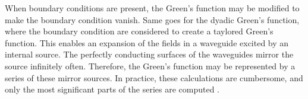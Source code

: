 When boundary conditions are present, the Green's function may be modified to make the boundary condition vanish. Same goes for the dyadic Green's function, where the boundary condition are considered to create a taylored Green's function. This enables an expansion of the fields in a waveguide excited by an internal source. The perfectly conducting surfaces of the waveguides mirror the source infinitely often. Therefore, the Green's function may be represented by a series of these mirror sources. In practice, these calculations are cumbersome, and only the most significant parts of the series are computed \cite{Collin_2015}. %



